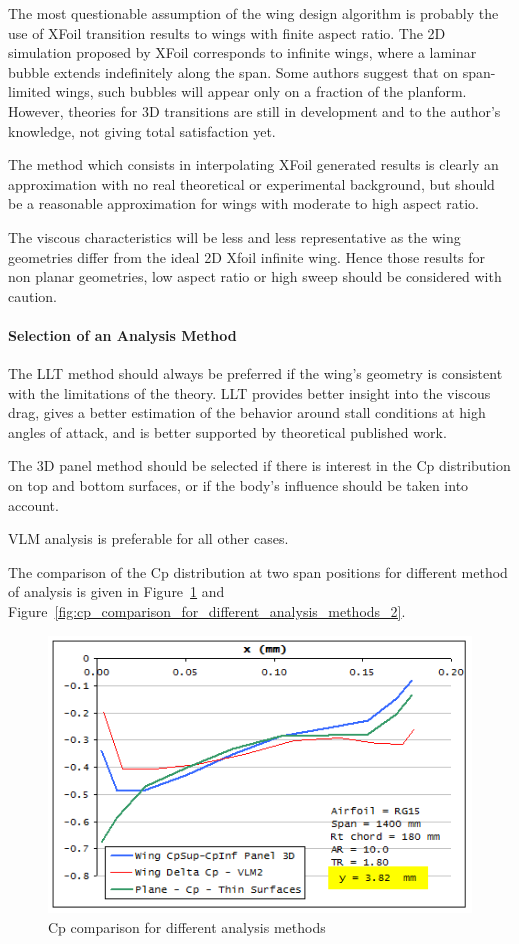 \documentclass[a4paper,twoside,12pt,dvips]{article}
\begin{document}
The most questionable assumption of the wing design algorithm is
probably the use of XFoil transition results to wings with finite
aspect ratio. The 2D simulation proposed by XFoil corresponds to
infinite wings, where a laminar bubble extends indefinitely along the
span. Some authors suggest that on span-limited wings, such bubbles
will appear only on a fraction of the planform. However, theories for
3D transitions are still in development and to the author's knowledge,
not giving total satisfaction yet.

The method which consists in interpolating XFoil generated results is
clearly an approximation with no real theoretical or experimental
background, but should be a reasonable approximation for wings with
moderate to high aspect ratio.

The viscous characteristics will be less and less representative as
the wing geometries differ from the ideal 2D Xfoil infinite
wing. Hence those results for non planar geometries, low aspect ratio
or high sweep should be considered with caution.

\paragraph{Selection of an Analysis Method}

The LLT method should always be preferred if the wing's geometry is
consistent with the limitations of the theory. LLT provides better
insight into the viscous drag, gives a better estimation of the
behavior around stall conditions at high angles of attack, and is
better supported by theoretical published work.

The 3D panel method should be selected if there is interest in the Cp
distribution on top and bottom surfaces, or if the body's influence
should be taken into account.

VLM analysis is preferable for all other cases.

The comparison of the Cp distribution at two span positions for
different method of analysis is given in
Figure~\ref{fig:cp_comparison_for_different_analysis_methods} and
Figure~\ref{fig:cp_comparison_for_different_analysis_methods_2}.

\begin{figure}[htbp]
  \includegraphics[width=0.8\linewidth]{img-25}\centering 
  \caption{Cp comparison for different analysis methods}
  \label{fig:cp_comparison_for_different_analysis_methods}
\end{figure}
\end{document}

